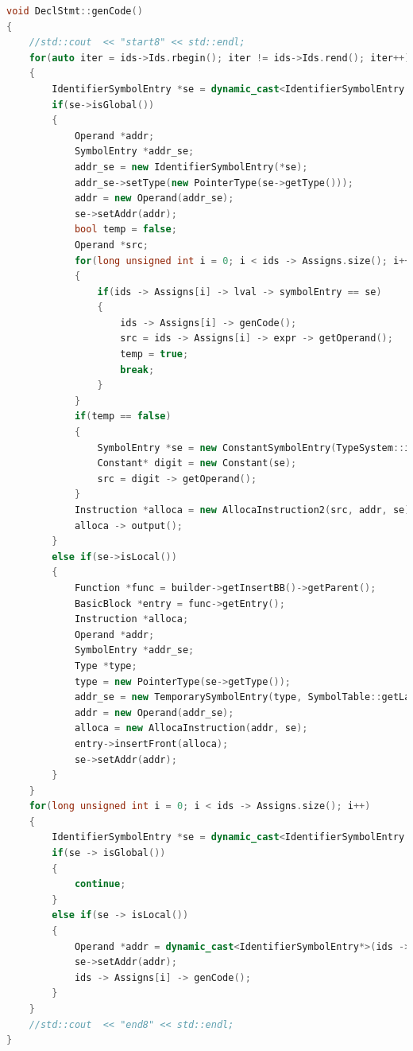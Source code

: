 \documentclass[UTF8,a4paper,10pt]{ctexart}
\begin{document}
\begin{lstlisting}[title = 标识符定义, language = c++]
void DeclStmt::genCode()
{
    //std::cout  << "start8" << std::endl;
    for(auto iter = ids->Ids.rbegin(); iter != ids->Ids.rend(); iter++)
    {
        IdentifierSymbolEntry *se = dynamic_cast<IdentifierSymbolEntry *>((*iter)-> getSymPtr());
        if(se->isGlobal())
        {
            Operand *addr;
            SymbolEntry *addr_se;
            addr_se = new IdentifierSymbolEntry(*se);
            addr_se->setType(new PointerType(se->getType()));
            addr = new Operand(addr_se);
            se->setAddr(addr);
            bool temp = false;
            Operand *src;
            for(long unsigned int i = 0; i < ids -> Assigns.size(); i++)
            {
                if(ids -> Assigns[i] -> lval -> symbolEntry == se)
                {
                    ids -> Assigns[i] -> genCode();
                    src = ids -> Assigns[i] -> expr -> getOperand();
                    temp = true;
                    break; 
                }              
            }
            if(temp == false)
            {
                SymbolEntry *se = new ConstantSymbolEntry(TypeSystem::intType, 0);
                Constant* digit = new Constant(se);
                src = digit -> getOperand();
            }
            Instruction *alloca = new AllocaInstruction2(src, addr, se);
            alloca -> output();
        }
        else if(se->isLocal())
        {
            Function *func = builder->getInsertBB()->getParent();
            BasicBlock *entry = func->getEntry();
            Instruction *alloca;
            Operand *addr;
            SymbolEntry *addr_se;
            Type *type;
            type = new PointerType(se->getType());
            addr_se = new TemporarySymbolEntry(type, SymbolTable::getLabel());
            addr = new Operand(addr_se);
            alloca = new AllocaInstruction(addr, se);                   // allocate space for local id in function stack.
            entry->insertFront(alloca);                                 // allocate instructions should be inserted into the begin of the entry block.
            se->setAddr(addr);                                          // set the addr operand in symbol entry so that we can use it in subsequent code generation.
        }
    }
    for(long unsigned int i = 0; i < ids -> Assigns.size(); i++)
    {
        IdentifierSymbolEntry *se = dynamic_cast<IdentifierSymbolEntry *>(ids -> Assigns[i] -> lval -> getSymPtr());
        if(se -> isGlobal())
        { 
            continue;                   
        }
        else if(se -> isLocal())
        {
            Operand *addr = dynamic_cast<IdentifierSymbolEntry*>(ids -> Assigns[i] -> lval ->getSymPtr())->getAddr();
            se->setAddr(addr); 
            ids -> Assigns[i] -> genCode();
        }
    }
    //std::cout  << "end8" << std::endl;
}
\end{lstlisting}
\end{document}
